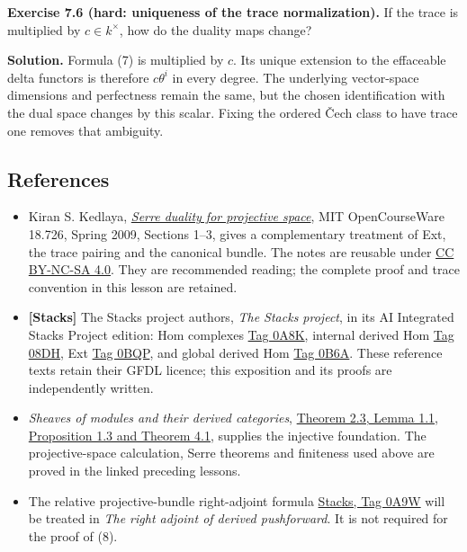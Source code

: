 \documentclass[11pt]{article}
\begin{document}
\textbf{Exercise 7.6 (hard: uniqueness of the trace normalization).} If
the trace is multiplied by \(c\in k^\times\), how do the duality maps
change?

\textbf{Solution.} Formula (7) is multiplied by \(c\). Its unique
extension to the effaceable delta functors is therefore \(c\theta^i\) in
every degree. The underlying vector-space dimensions and perfectness
remain the same, but the chosen identification with the dual space
changes by this scalar. Fixing the ordered Čech class to have trace one
removes that ambiguity.

\subsection{References}\label{references-6}

\begin{itemize}
\item
  Kiran S. Kedlaya,
  \href{https://ocw.mit.edu/courses/18-726-algebraic-geometry-spring-2009/resources/mit18_726s09_lec23_serre_dual_proj/}{\emph{Serre
  duality for projective space}}, MIT OpenCourseWare 18.726, Spring
  2009, Sections 1--3, gives a complementary treatment of Ext, the trace
  pairing and the canonical bundle. The notes are reusable under
  \href{https://ocw.mit.edu/pages/privacy-and-terms-of-use/}{CC BY-NC-SA
  4.0}. They are recommended reading; the complete proof and trace
  convention in this lesson are retained.
\item
  \textbf{{[}Stacks{]}} The Stacks project authors, \emph{The Stacks
  project}, in its AI Integrated Stacks Project edition: Hom complexes
  \href{https://kokunoyumeto.github.io/stacks-zh-hans-cn/en/cohomology.html\#cohomology-section-hom-complexes}{Tag
  0A8K}, internal derived Hom
  \href{https://kokunoyumeto.github.io/stacks-zh-hans-cn/en/cohomology.html\#cohomology-section-internal-hom}{Tag
  08DH}, Ext
  \href{https://kokunoyumeto.github.io/stacks-zh-hans-cn/en/cohomology.html\#cohomology-section-ext}{Tag
  0BQP}, and global derived Hom
  \href{https://kokunoyumeto.github.io/stacks-zh-hans-cn/en/cohomology.html\#cohomology-section-global-RHom}{Tag
  0B6A}. These reference texts retain their GFDL licence; this
  exposition and its proofs are independently written.
\item
  \emph{Sheaves of modules and their derived categories},
  \href{../derived-categories-and-sheaf-operations/injective-modules-and-bounded-below-derived-functors.html}{Theorem
  2.3, Lemma 1.1, Proposition 1.3 and Theorem 4.1}, supplies the
  injective foundation. The projective-space calculation, Serre theorems
  and finiteness used above are proved in the linked preceding lessons.
\item
  The relative projective-bundle right-adjoint formula
  \href{https://kokunoyumeto.github.io/stacks-zh-hans-cn/en/duality.html\#duality-lemma-upper-shriek-P1}{Stacks,
  Tag 0A9W} will be treated in \emph{The right adjoint of derived
  pushforward}. It is not required for the proof of (8).
\end{itemize}
\end{document}

